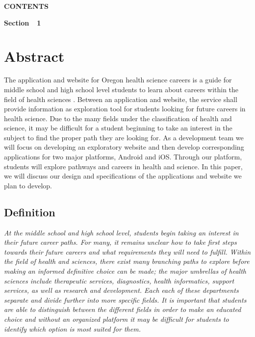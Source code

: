 \documentclass[twoside,letterpaper]{article}
\begin{document}
{

{\centering{}\bfseries\color{black}
CONTENTS
\par}


\bigskip

{\bfseries\color{black}
Section\ \ 1}

\setcounter{tocdepth}{9}
\renewcommand\contentsname{}
\tableofcontents

\bigskip

\clearpage\clearpage\setcounter{page}{1}\pagestyle{Convertii}
\section[Abstract]{\rmfamily\bfseries\color{black}
Abstract}
{\color{black}
The application and website for Oregon health science careers is a guide for middle school and high school level students to learn about careers within the field of health sciences . Between an application and website, the service shall provide information as exploration tool for students looking for future careers in health science. Due to the many fields under the classification of health and science, it may be difficult for a student beginning to take an interest in the subject to find the proper path they are looking for. As a development team we will focus on developing an exploratory website and then develop corresponding applications for two major platforms, Android and iOS. Through our platform, students will explore pathways and careers in health and science. In this paper, we will discuss our design and specifications of the applications and website we plan to develop.}


\subsection[Definition]{\rmfamily\bfseries\color{black}
Definition}
{\itshape\color{black}
At the middle school and high school level, students begin taking an interest in their future career paths. For many, it remains unclear how to take first steps towards their future careers and what requirements they will need to fulfill. Within the field of health and sciences, there exist many branching paths to explore before making an informed definitive choice can be made; the major umbrellas of health sciences include therapeutic services, diagnostics, health informatics, support services, as well as research and development. Each each of these departments separate and divide further into more specific fields. It is important that students are able to distinguish between the different fields in order to make an educated choice and without an organized platform it may be difficult for students to identify which option is most suited for them.}


}
\end{document}
